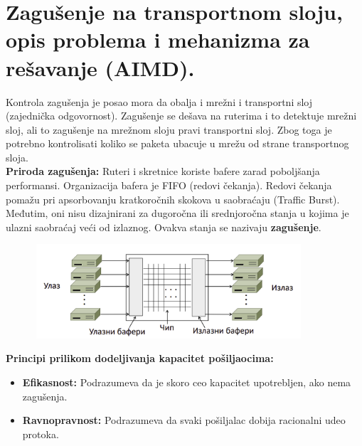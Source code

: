 \documentclass[a4paper]{article}
\begin{document}
\section{Zagušenje na transportnom sloju, opis problema i mehanizma za rešavanje (AIMD).}
    Kontrola zagušenja je posao mora da obalja i mrežni i transportni sloj (zajednička odgovornost).
    Zagušenje se dešava na ruterima i to detektuje mrežni sloj, ali to zagušenje na mrežnom sloju
    pravi transportni sloj. Zbog toga je potrebno kontrolisati koliko se paketa ubacuje u mrežu
    od strane transportnog sloja. \\
    \indent \textbf{Priroda zagušenja:} Ruteri i skretnice koriste bafere zarad poboljšanja 
    performansi. Organizacija bafera je FIFO (redovi čekanja). Redovi čekanja pomažu pri apsorbovanju 
    kratkoročnih skokova u saobraćaju (Traffic Burst). Međutim, oni nisu dizajnirani za dugoročna
    ili srednjoročna stanja u kojima je ulazni saobraćaj veći od izlaznog. Ovakva stanja se nazivaju
    \textbf{zagušenje}.
    \begin{figure}[H]
        \begin{center}
            \includegraphics[width=100mm,height=35mm]{Slike/tcp_zagusenje1.png}
        \end{center}
    \end{figure}
    \noindent \textbf{Principi prilikom dodeljivanja kapacitet pošiljaocima:}
    \begin{itemize}
        \item \textbf{Efikasnost:} Podrazumeva da je skoro ceo kapacitet upotrebljen,
              ako nema zagušenja.
        \item \textbf{Ravnopravnost:} Podrazumeva da svaki pošiljalac dobija racionalni
              udeo protoka.
    \end{itemize}
\end{document}
